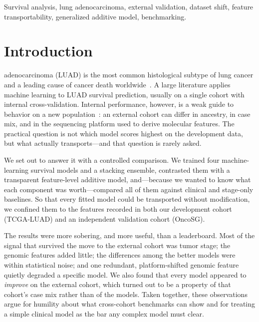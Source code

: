 \documentclass[journal]{IEEEtran}
\begin{document}
\begin{IEEEkeywords}
Survival analysis, lung adenocarcinoma, external validation, dataset shift,
feature transportability, generalized additive model, benchmarking.
\end{IEEEkeywords}

\section{Introduction}
 adenocarcinoma (LUAD) is the most common histological
subtype of lung cancer and a leading cause of cancer death worldwide~\cite{siegel2023}.
A large literature applies machine learning to LUAD survival prediction, usually
on a single cohort with internal cross-validation. Internal performance,
however, is a weak guide to behavior on a new population~\cite{tripod2015}: an
external cohort can differ in ancestry, in case mix, and in the sequencing
platform used to derive molecular features. The practical question is not which
model scores highest on the development data, but what actually transports---and
that question is rarely asked.

We set out to answer it with a controlled comparison. We trained four
machine-learning survival models and a stacking ensemble, contrasted them with a
transparent feature-level additive model, and---because we wanted to know what
each component was worth---compared all of them against clinical and stage-only
baselines. So that every fitted model could be transported without
modification, we confined them to the features recorded in both our development
cohort (TCGA-LUAD) and an independent validation cohort (OncoSG).

The results were more sobering, and more useful, than a leaderboard. Most
of the signal that survived the move to the external cohort was tumor stage; the
genomic features added little; the differences among the
better models were within statistical noise; and one redundant, platform-shifted
genomic feature quietly degraded a specific model. We also found that every
model appeared to \emph{improve} on the external cohort, which turned out to be
a property of that cohort's case mix rather than of the models. Taken together,
these observations argue for humility about what cross-cohort benchmarks can
show and for treating a simple clinical model as the bar any complex model must
clear.
\end{document}
